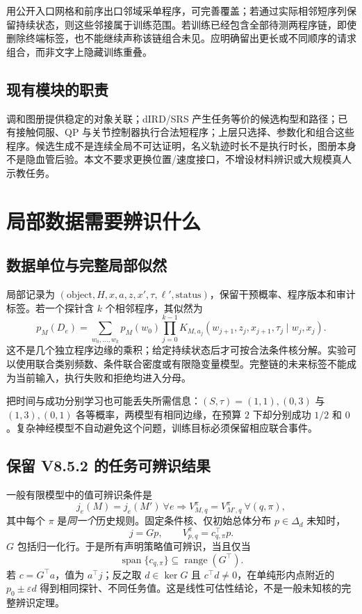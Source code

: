 \documentclass[11pt,a4paper,fontset=fandol]{ctexart}
\theoremstyle{definition}
\theoremstyle{remark}\newtheorem{remark}[theorem]{说明}
\numberwithin{equation}{section}
\begin{document}
用公开入口网格和前序出口邻域采单程序，可完善覆盖；若通过实际相邻短序列保留持续状态，则这些邻接属于训练范围。若训练已经包含全部待测两程序链，即使删除终端标签，也不能继续声称该链组合未见。应明确留出更长或不同顺序的请求组合，而非文字上隐藏训练重叠。

\subsection{现有模块的职责}
调和图册提供稳定的对象关联；dIRD/SRS 产生任务等价的候选构型和路径；已有接触伺服、QP 与关节控制器执行合法短程序；上层只选择、参数化和组合这些程序。候选生成不是连续全局不可达证明，名义轨迹时长不是执行时长，图册本身不是隐血管后验。本文不要求更换位置/速度接口，不增设材料辨识或大规模真人示教任务。

\section{局部数据需要辨识什么}
\label{sec:learning}
\subsection{数据单位与完整局部似然}
局部记录为 $(\mathrm{object},H,x,a,z,x',\tau,\ell',\mathrm{status})$，保留干预概率、程序版本和审计标签。若一个探针含 $k$ 个相邻程序，其似然为
\begin{equation}
 p_M(D_e)=\sum_{w_0,\ldots,w_k}p_M(w_0)
 \prod_{j=0}^{k-1}K_{M,a_j}(w_{j+1},z_j,x_{j+1},\tau_j\mid w_j,x_j).
 \label{eq:likelihood}
\end{equation}
这不是几个独立程序边缘的乘积；给定持续状态后才可按合法条件核分解。实验可以使用联合类别频数、条件联合密度或有限隐变量模型。完整链的未来标签不能成为当前输入，执行失败和拒绝均进入分母。

把时间与成功分别学习也可能丢失所需信息：$(S,\tau)=(1,1),(0,3)$ 与 $(1,3),(0,1)$ 各等概率，两模型有相同边缘，在预算 $2$ 下却分别成功 $1/2$ 和 $0$。复杂神经模型不自动避免这个问题，训练目标必须保留相应联合事件。

\subsection{保留 V8.5.2 的任务可辨识结果}
一般有限模型中的值可辨识条件是
\begin{equation}
 j_e(M)=j_e(M')\ \forall e
 \Longrightarrow
 V_{M,q}^{\pi}=V_{M',q}^{\pi}\ \forall(q,\pi),
 \label{eq:ident_general}
\end{equation}
其中每个 $\pi$ 是\emph{同一个}历史规则。固定条件核、仅初始总体分布 $p\in\Delta_d$ 未知时，
\begin{equation}
 j=Gp,\qquad V_{p,q}^{\pi}=c_{q,\pi}^{\top}p.
\end{equation}
$G$ 包括归一化行。于是所有声明策略值可辨识，当且仅当
\begin{equation}
 \operatorname{span}\{c_{q,\pi}\}\subseteq\operatorname{range}(G^\top).
 \label{eq:rank}
\end{equation}
若 $c=G^\top a$，值为 $a^\top j$；反之取 $d\in\ker G$ 且 $c^\top d\ne0$，在单纯形内点附近的 $p_0\pm\varepsilon d$ 得到相同探针、不同任务值。这是线性可估性结论，不是一般未知核的完整辨识定理。
\end{document}
